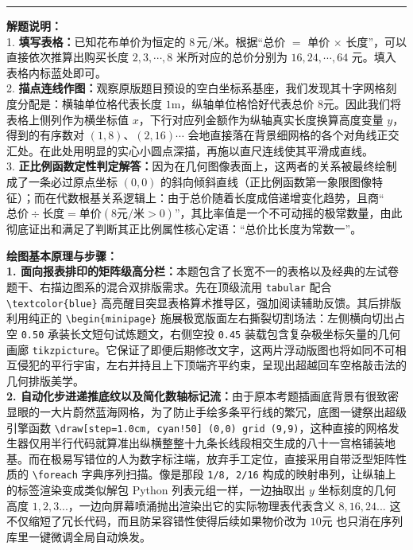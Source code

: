 \vspace{0.8cm}
\hrule
\vspace{0.4cm}

{\small\color{gray}
\textbf{解题说明：}\\
1. \textbf{填写表格：}已知花布单价为恒定的 $8\,\text{元/米}$。根据“总价 $=$ 单价 $\times$ 长度”，可以直接依次推算出购买长度 $2, 3, \cdots, 8$ 米所对应的总价分别为 $16, 24, \cdots, 64$ 元。填入表格内标蓝处即可。\\
2. \textbf{描点连线作图：}观察原版题目预设的空白坐标系基座，我们发现其十字网格刻度分配是：横轴单位格代表长度 $1\text{m}$，纵轴单位格恰好代表总价 $8\text{元}$。因此我们将表格上侧列作为横坐标值 $x$，下行对应列金额作为纵轴真实长度换算高度变量 $y$，得到的有序数对 $(1,8)、(2,16) \cdots$ 会地直接落在背景细网格的各个对角线正交汇处。在此处用明显的实心小圆点深描，再施以直尺连线使其平滑成直线。\\
3. \textbf{正比例函数定性判定解答：}因为在几何图像表面上，这两者的关系被最终绘制成了一条必过原点坐标 $(0,0)$ 的斜向倾斜直线（正比例函数第一象限图像特征）；而在代数根基关系逻辑上：由于总价随着长度成倍递增变化趋势，且商“$\text{总价} \div \text{长度} = \text{单价}(8\text{元/米} > 0)$”，其比率值是一个不可动摇的极常数量，由此彻底证出和满足了判断其正比例属性核心定语：“总价比长度为常数一”。
}

\vspace{0.6cm}

{\small\color{blue!70!black}
\textbf{绘图基本原理与步骤：}\\
\textbf{1. 面向报表排印的矩阵级高分栏：}本题包含了长宽不一的表格以及经典的左试卷题干、右描边图系的混合双排版需求。先在顶级流用 \texttt{tabular} 配合 \texttt{\textbackslash textcolor\{blue\}} 高亮醒目突显表格算术推导区，强加阅读辅助反馈。其后排版利用纯正的 \texttt{\textbackslash begin\{minipage\}} 施展极宽版面左右撕裂切割场法：左侧横向切出占空 \texttt{0.50} 承装长文短句试炼题文，右侧空投 \texttt{0.45} 装载包含复杂极坐标矢量的几何画廊 \texttt{tikzpicture}。它保证了即便后期修改文字，这两片浮动版图也将如同不可相互侵犯的平行宇宙，左右并持且上下顶端齐平约束，呈现出超越回车空格敲击法的几何排版美学。\\
\textbf{2. 自动化步进递推底纹以及简化数轴标记流：}由于原本考题插画底背景有很致密显眼的一大片蔚然蓝海网格，为了防止手绘多条平行线的繁冗，底图一键祭出超级引擎函数 \texttt{\textbackslash draw[step=1.0cm, cyan!50] (0,0) grid (9,9)}，这种直接的网格发生器仅用半行代码就算准出纵横整整十九条长线段相交生成的八十一宫格铺装地基。而在极易写错位的人为数字标注端，放弃手工定位，直接采用自带泛型矩阵性质的 \texttt{\textbackslash foreach} 字典序列扫描。像是那段 \texttt{1/8, 2/16} 构成的映射串列，让纵轴上的标签渲染变成类似解包 Python 列表元组一样，一边抽取出 $y$ 坐标刻度的几何高度 $1,2,3...$，一边向屏幕喷涌抛出渲染出它的实际物理表代表含义 $8,16,24...$ 这不仅缩短了冗长代码，而且防呆容错性使得后续如果物价改为 $10\text{元}$ 也只消在序列库里一键微调全局自动焕发。
}

